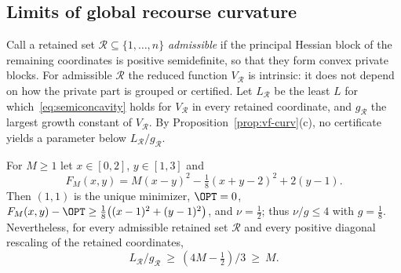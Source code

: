 \subsection{Limits of global recourse curvature}

Call a retained set $\mathcal R\subseteq\{1,\ldots,n\}$ \emph{admissible} if the
principal Hessian block of the remaining coordinates is positive
semidefinite, so that they form convex private blocks. For admissible
$\mathcal R$ the reduced function $V_{\mathcal R}$ is intrinsic: it does not
depend on how the private part is grouped or certified. Let
$L_{\mathcal R}$ be the least $L$ for which~\eqref{eq:semiconcavity} holds for
$V_{\mathcal R}$ in every retained coordinate, and $g_{\mathcal R}$ the largest
growth constant of $V_{\mathcal R}$. By Proposition~\ref{prop:vf-curv}(c), no
certificate yields a parameter below $L_{\mathcal R}/g_{\mathcal R}$.

\begin{proposition}\label{prop:cr-limit}
For $M\ge1$ let $x\in[0,2]$, $y\in[1,3]$ and
\[
F_M(x,y)=M(x-y)^2-\tfrac18(x+y-2)^2+2(y-1).
\]
Then $(1,1)$ is the unique minimizer, $\OPT=0$,
$F_M(x,y)-\OPT\ge\frac18\bigl((x-1)^2+(y-1)^2\bigr)$, and $\nu=\frac12$; thus
$\nu/g\le4$ with $g=\frac18$. Nevertheless, for every
admissible retained set $\mathcal R$ and every positive diagonal rescaling of
the retained coordinates,
\[
L_{\mathcal R}/g_{\mathcal R}\ \ge\ (4M-\tfrac12)/3\ \ge\ M.
\]
\end{proposition}

